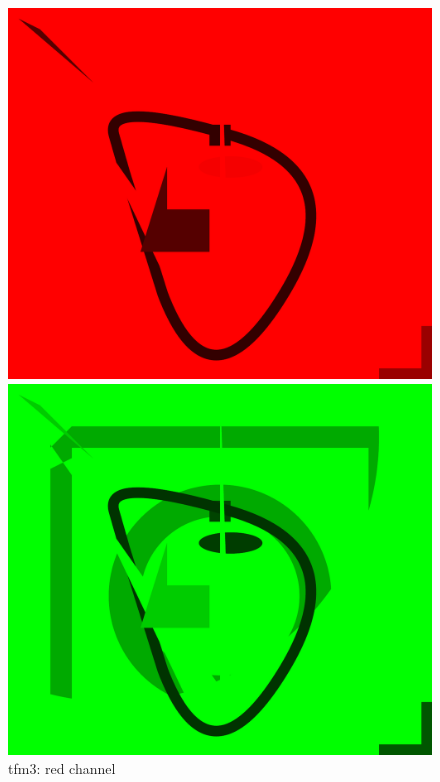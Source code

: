\documentclass[12pt]{article}
\begin{document}
\pagebreak

\vfill
\begin{figure}[h]
	\centering
	\begin{minipage}[b]{0.3\textwidth}
		\includegraphics[width=\textwidth]{./pdf/main-test-out-3.pdf}
		\caption{tfm3: red channel}
	\end{minipage}
	\hfill
	\begin{minipage}[b]{0.3\textwidth}
		\includegraphics[width=\textwidth]{./pdf/main-test-out-4.pdf}

\end{minipage}
\end{figure}
\end{document}
